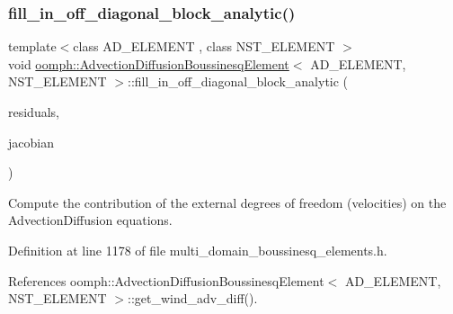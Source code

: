 \subsubsection{\texorpdfstring{fill\+\_\+in\+\_\+off\+\_\+diagonal\+\_\+block\+\_\+analytic()}{fill\_in\_off\_diagonal\_block\_analytic()}}
{\footnotesize\ttfamily template$<$class A\+D\+\_\+\+E\+L\+E\+M\+E\+NT , class N\+S\+T\+\_\+\+E\+L\+E\+M\+E\+NT $>$ \\
void \hyperlink{classoomph_1_1AdvectionDiffusionBoussinesqElement}{oomph\+::\+Advection\+Diffusion\+Boussinesq\+Element}$<$ A\+D\+\_\+\+E\+L\+E\+M\+E\+NT, N\+S\+T\+\_\+\+E\+L\+E\+M\+E\+NT $>$\+::fill\+\_\+in\+\_\+off\+\_\+diagonal\+\_\+block\+\_\+analytic (\begin{DoxyParamCaption}\item[{Vector$<$ double $>$ \&}]{residuals,  }\item[{Dense\+Matrix$<$ double $>$ \&}]{jacobian }\end{DoxyParamCaption})\hspace{0.3cm}{\ttfamily [inline]}}



Compute the contribution of the external degrees of freedom (velocities) on the Advection\+Diffusion equations. 



Definition at line 1178 of file multi\+\_\+domain\+\_\+boussinesq\+\_\+elements.\+h.



References oomph\+::\+Advection\+Diffusion\+Boussinesq\+Element$<$ A\+D\+\_\+\+E\+L\+E\+M\+E\+N\+T, N\+S\+T\+\_\+\+E\+L\+E\+M\+E\+N\+T $>$\+::get\+\_\+wind\+\_\+adv\+\_\+diff().

\mbox{\label{classoomph_1_1AdvectionDiffusionBoussinesqElement_a89ea74af5d011a3866999c3760621edf}} 

